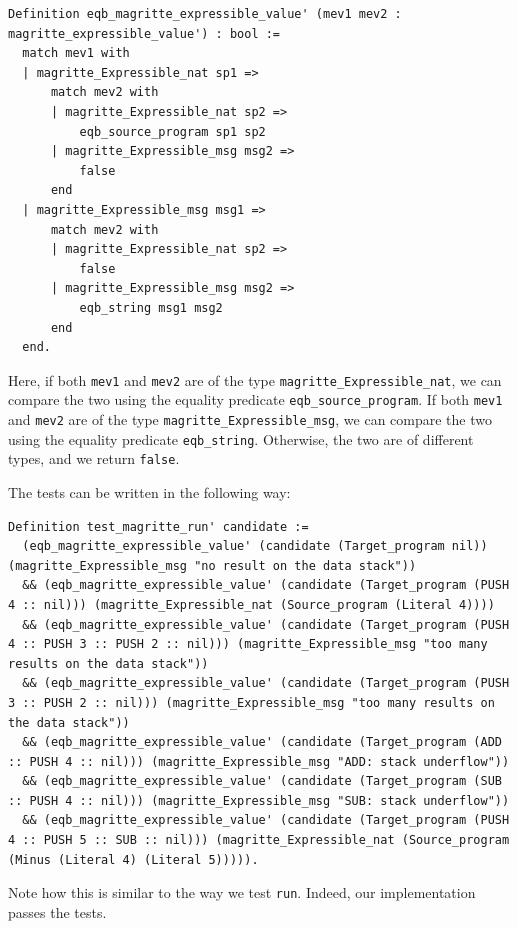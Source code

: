 \documentclass{article}
\begin{document}
\begin{lstlisting}
Definition eqb_magritte_expressible_value' (mev1 mev2 : magritte_expressible_value') : bool :=
  match mev1 with
  | magritte_Expressible_nat sp1 =>
      match mev2 with
      | magritte_Expressible_nat sp2 =>
          eqb_source_program sp1 sp2
      | magritte_Expressible_msg msg2 =>
          false
      end
  | magritte_Expressible_msg msg1 =>
      match mev2 with
      | magritte_Expressible_nat sp2 =>
          false
      | magritte_Expressible_msg msg2 =>
          eqb_string msg1 msg2
      end
  end.
\end{lstlisting}

Here, if both \texttt{mev1} and \texttt{mev2} are of the type \texttt{magritte\_Expressible\_nat}, we can compare the two using the equality predicate \texttt{eqb\_source\_program}. If both \texttt{mev1} and \texttt{mev2} are of the type \texttt{magritte\_Expressible\_msg}, we can compare the two using the equality predicate \texttt{eqb\_string}. Otherwise, the two are of different types, and we return \texttt{false}.

The tests can be written in the following way:

\begin{lstlisting}
Definition test_magritte_run' candidate :=
  (eqb_magritte_expressible_value' (candidate (Target_program nil)) (magritte_Expressible_msg "no result on the data stack"))
  && (eqb_magritte_expressible_value' (candidate (Target_program (PUSH 4 :: nil))) (magritte_Expressible_nat (Source_program (Literal 4))))
  && (eqb_magritte_expressible_value' (candidate (Target_program (PUSH 4 :: PUSH 3 :: PUSH 2 :: nil))) (magritte_Expressible_msg "too many results on the data stack"))
  && (eqb_magritte_expressible_value' (candidate (Target_program (PUSH 3 :: PUSH 2 :: nil))) (magritte_Expressible_msg "too many results on the data stack"))
  && (eqb_magritte_expressible_value' (candidate (Target_program (ADD :: PUSH 4 :: nil))) (magritte_Expressible_msg "ADD: stack underflow"))
  && (eqb_magritte_expressible_value' (candidate (Target_program (SUB :: PUSH 4 :: nil))) (magritte_Expressible_msg "SUB: stack underflow"))
  && (eqb_magritte_expressible_value' (candidate (Target_program (PUSH 4 :: PUSH 5 :: SUB :: nil))) (magritte_Expressible_nat (Source_program (Minus (Literal 4) (Literal 5))))).
\end{lstlisting}

Note how this is similar to the way we test \texttt{run}. Indeed, our implementation passes the tests.
\end{document}
